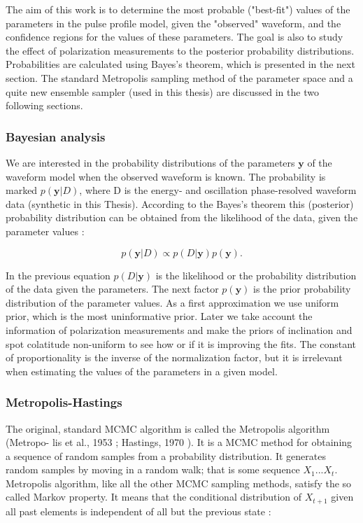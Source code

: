 \documentclass{wihuri}
\def\be{\begin{equation}}
\def\ee{\end{equation}}
\begin{document}
The aim of this work is to determine the most probable ("best-fit") values of the parameters in the pulse profile model, given the "observed" waveform, and the confidence regions for the values of these parameters. The goal is also to study the effect of polarization measurements to the posterior probability distributions. Probabilities are calculated using Bayes's theorem, which is presented in the next section. The standard Metropolis sampling method of the parameter space and a quite new ensemble sampler (used in this thesis) are discussed in the two following sections. 

\subsubsection{Bayesian analysis}

We are interested in the probability distributions of the parameters $\textbf{y}$ of the waveform model when the observed waveform is known. The probability is marked $p(\textbf{y}|D)$, where D is the energy- and oscillation phase-resolved waveform data (synthetic in this Thesis). According to the Bayes's theorem this (posterior) probability distribution can be obtained from the likelihood of the data, given the parameter values \cite{nattila_bayes}:


\be \label{eq:bayes}
p(\textbf{y}|D) \propto p(D|\textbf{y})p(\textbf{y}).
\ee

In the previous equation $p(D|\textbf{y})$ is the likelihood or the probability distribution of the data given the parameters. The next factor $p(\textbf{y})$ is the prior probability distribution of the parameter values. As a first approximation we use uniform prior, which is the most uninformative prior. Later we take account the information of polarization measurements and make the priors of inclination and spot colatitude non-uniform to see how or if it is improving the fits. The constant of proportionality is the inverse of the normalization factor, but it is irrelevant when estimating the values of the parameters in a given model. 


\subsubsection{Metropolis-Hastings}

The original, standard MCMC algorithm is called the Metropolis algorithm (Metropo-
lis et al., 1953 \cite{metropolis53}; Hastings, 1970 \cite{hastings70}). It is a MCMC method for obtaining a sequence of random samples from a probability distribution. It generates random samples by moving in a random walk; that is some sequence $X_{1}...X_{t}$. Metropolis algorithm, like all the other MCMC sampling methods, satisfy the so called Markov property. It means that the conditional distribution of $X_{t+1}$ given all past elements is independent of all but the previous state \cite{kaiser}:
\end{document}
